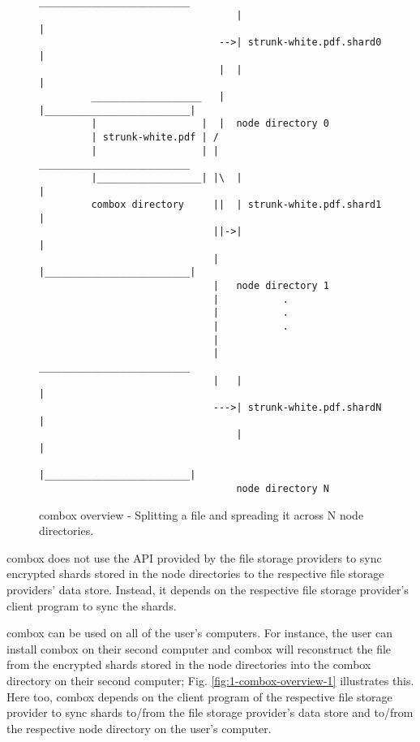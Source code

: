 \begin{figure}[h]
\begin{verbatim}

                                  __________________________
                                  |                         |
                               -->| strunk-white.pdf.shard0 |
                               |  |                         |
         ___________________   |  |_________________________|
         |                  |  |  node directory 0
         | strunk-white.pdf | /
         |                  | |   __________________________
         |__________________| |\  |                         |
         combox directory     ||  | strunk-white.pdf.shard1 |
                              ||->|                         |
                              |   |_________________________|
                              |   node directory 1
                              |           .
                              |           .
                              |           .
                              |
                              |   __________________________
                              |   |                         |
                              --->| strunk-white.pdf.shardN |
                                  |                         |
                                  |_________________________|
                                  node directory N
\end{verbatim}
  \caption{combox overview - Splitting a file and spreading it across
    N node directories.}
  \label{fig:1-combox-overview-0}
\end{figure}

combox does not use the API provided by the file storage providers to
sync encrypted shards stored in the node directories to the respective
file storage providers' data store. Instead, it depends on the
respective file storage provider's client program to sync the shards.

combox can be used on all of the user's computers. For instance, the
user can install combox on their second computer and combox will
reconstruct the file from the encrypted shards stored in the node
directories into the combox directory on their second computer;
Fig. \ref{fig:1-combox-overview-1} illustrates this. Here too, combox
depends on the client program of the respective file storage provider
to sync shards to/from the file storage provider's data store and
to/from the respective node directory on the user's computer.

